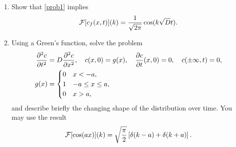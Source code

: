 \documentclass[a4paper, 12pt]{article}
\begin{document}
\begin{enumerate}[label={\bf \arabic{*}.\;}, ref={\arabic{*}},itemsep=3ex, left=0ex]
{      \begin{enumerate}[label=(\alph*)]
        \item Show that \cref{prob1} implies
          \begin{equation}
            \mathcal{F}[c_f(x,t)](k) = \frac{1}{\sqrt{2\pi}}\cos(k\sqrt{D}t).
          \end{equation}

        \item
          Using a Green's function, solve the problem
          \begin{align}
            \pdd{c}{t} &= D\pdd{c}{x},\quad c(x,0) = g(x),\quad \pd{c}{t}(x,0) = 0,\quad c(\pm\infty,t) = 0,\\
            g(x)&=
            \begin{cases}
              0 & x< -a,\\
              1 & -a \leq x \leq a,\\
              0 & x>a,
            \end{cases}
          \end{align}
          and describe briefly the changing shape of the distribution over time.  You may use the result
          \begin{equation}
            \mathcal{F}[\cos(a x)](k) = \sqrt{\frac{\pi}{2}}\left[\delta(k-a) + \delta(k+a)\right].
          \end{equation}


\end{enumerate}}
\end{enumerate}
\end{document}
